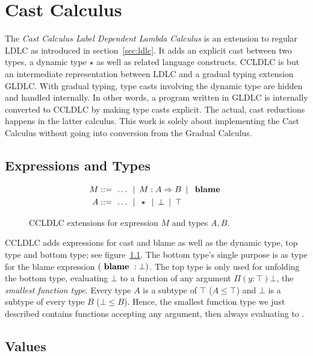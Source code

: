 \chapter{Cast Calculus}\label{chap:cast-calculus}

The \emph{Cast Calculus Label Dependent Lambda Calculus} is an extension to regular LDLC as introduced in section~\ref{sec:ldlc}. It adds an explicit cast between two types, a dynamic type $\star$ as well as related language constructs. CCLDLC is but an intermediate representation between LDLC and a gradual typing extension GLDLC. With gradual typing, type casts involving the dynamic type are hidden and handled internally. In other words, a program written in GLDLC is internally converted to CCLDLC by making type casts explicit. The actual, cast reductions happens in the latter calculus. This work is solely about implementing the Cast Calculus without going into conversion from the Gradual Calculus.

\section{Expressions and Types}\label{sec:cc-expressions}

\begin{figure}
\begin{align*}
 M ::= & \enspace \dots \enspace|\enspace
     M : A \Rightarrow B \enspace|\enspace \text{ \textbf{blame} } \\
 A ::= & \enspace \dots \enspace|\enspace
     \star \enspace|\enspace \bot \enspace|\enspace \top
\end{align*}
\caption{CCLDLC  extensions for expression $M$ and types $A,  B$.}
\label{fig:ccldlc-extensions}
\end{figure}

CCLDLC adds expressions for cast and blame as well as the dynamic type, top type and bottom type; see figure~\ref{fig:ccldlc-extensions}.
The bottom type's single purpose is as type for the blame expression $(\text{ \textbf{blame} } : \bot)$. The top type is only used for unfolding the bottom type, evaluating $\bot$ to a function of any argument $\Pi(y:\top)\bot$, the \emph{smallest function type}. Every type $A$ is a subtype of $\top$ ($A \leq \top$) and $\bot$ is a subtype of every type $B$ ($\bot \leq B$). Hence, the smallest function type we just described contains functions accepting any argument, then always evaluating to \blame.

\section{Values}

